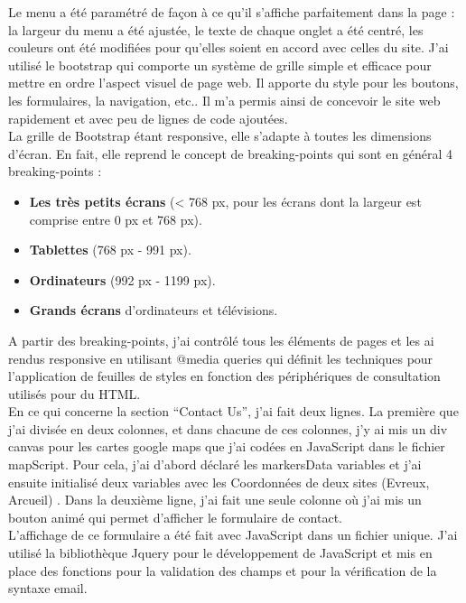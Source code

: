 \documentclass[a4paper, 12pt]{report}
\begin{document}
Le menu a été paramétré de façon à ce qu’il s’affiche parfaitement dans la page : la largeur du menu a été ajustée, le texte de chaque onglet a été centré, les couleurs ont été modifiées pour qu’elles soient en accord avec celles du site.
J'ai utilisé le bootstrap qui comporte un système de grille simple et efficace pour mettre en ordre l'aspect visuel de page web. Il apporte du style pour les boutons, les formulaires, la navigation, etc.. Il m’a permis ainsi de concevoir le site web rapidement et avec peu de lignes de code ajoutées.\\

La grille de Bootstrap étant responsive, elle s'adapte à toutes les dimensions d'écran. En fait, elle reprend le concept de breaking-points qui sont en général 4 breaking-points :
\begin{itemize}
\item \textbf{Les très petits écrans} (< 768 px, pour les écrans dont la largeur est comprise entre 0 px et 768 px).
\item \textbf{Tablettes} (768 px - 991 px).
\item \textbf{Ordinateurs} (992 px - 1199 px).
\item \textbf{Grands écrans} d'ordinateurs et télévisions.\\
\end{itemize}
A partir des breaking-points, j’ai contrôlé tous les éléments de pages et les ai rendus responsive en utilisant @media queries qui définit les techniques pour l'application de feuilles de styles en fonction des périphériques de consultation utilisés pour du HTML.\\
En ce qui concerne la section “Contact Us”, j’ai fait deux lignes. La première que j’ai divisée en deux colonnes, et dans chacune de ces colonnes, j’y ai mis un div canvas pour les cartes google maps que j’ai codées en JavaScript \cite{6} dans le fichier mapScript. Pour cela, j’ai d’abord déclaré les markersData variables et j’ai ensuite initialisé deux variables avec les Coordonnées de deux sites (Evreux, Arcueil) . 
Dans la deuxième ligne, j’ai fait une seule colonne où j’ai mis un bouton animé qui permet d’afficher le formulaire de contact.\\
L’affichage de ce formulaire a été fait avec JavaScript dans un fichier unique. J’ai utilisé la bibliothèque Jquery \cite{7} pour le développement de JavaScript et mis en place des fonctions pour la validation des champs et pour la vérification de la syntaxe email.\\
\end{document}
